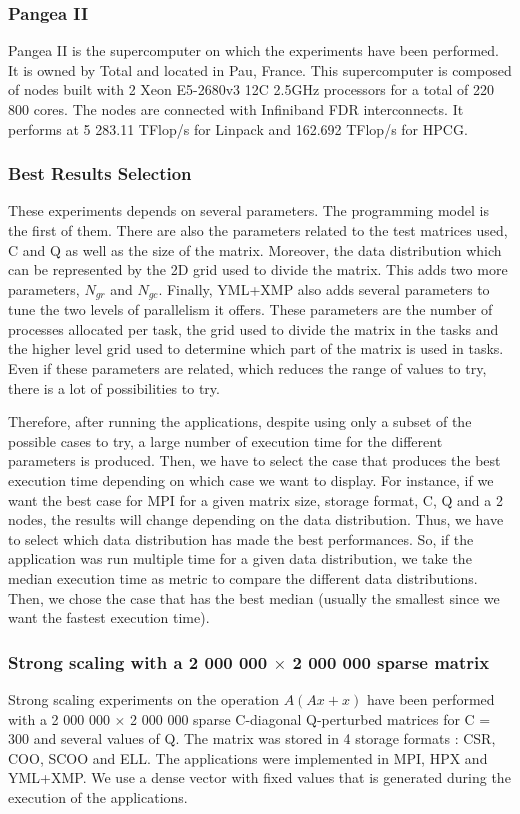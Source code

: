 \subsubsection{Pangea II}
Pangea II is the supercomputer on which the experiments have been performed.
It is owned by Total and located in Pau, France.
This supercomputer is composed of nodes built with 2 Xeon E5-2680v3 12C 2.5GHz processors for a total of 220 800 cores.
The nodes are connected with Infiniband FDR interconnects.
It performs at 5 283.11 TFlop/s for Linpack and 162.692 TFlop/s for HPCG.

\subsubsection{Best Results Selection}
These experiments depends on several parameters.
The programming model is the first of them.
There are also the parameters related to the test matrices used, C and Q as well as the size of the matrix.
Moreover, the data distribution which can be represented by the 2D grid used to divide the matrix.
This adds two more parameters, $N_{gr}$ and $N_{gc}$.
Finally, YML+XMP also adds several parameters to tune the two levels of parallelism it offers.
These parameters are the number of processes allocated per task, the grid used to divide the matrix in the tasks and the higher level grid used to determine which part of the matrix is used in tasks.
Even if these parameters are related, which reduces the range of values to try, there is a lot of possibilities to try.

Therefore, after running the applications, despite using only a subset of the possible cases to try, a large number of execution time for the different parameters is produced.
Then, we have to select the case that produces the best execution time depending on which case we want to display.
For instance, if we want the best case for MPI for a given matrix size, storage format, C, Q and a 2 nodes, the results will change depending on the data distribution.
Thus, we have to select which data distribution has made the best performances.
So, if the application was run multiple time for a given data distribution, we take the median execution time as metric to compare the different data distributions.
Then, we chose the case that has the best median (usually the smallest since we want the fastest execution time).

\subsubsection{Strong scaling with a 2 000 000 $\times$ 2 000 000 sparse matrix}
Strong scaling experiments on the operation $A(Ax+x)$ have been performed with a 2 000 000 $\times$ 2 000 000 sparse C-diagonal Q-perturbed matrices for C = 300 and several values of Q.
The matrix was stored in 4 storage formats : CSR, COO, SCOO and ELL.
The applications were implemented in MPI, HPX and YML+XMP.
We use a dense vector with fixed values that is generated during the execution of the applications.

